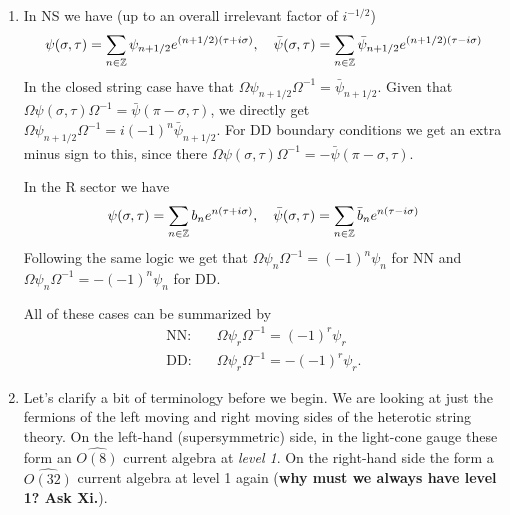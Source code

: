 \documentclass[11pt, class=article, crop=false]{standalone}
\begin{document}
\begin{enumerate}
	\item In NS we have (up to an overall irrelevant factor of $i^{-1/2}$)
	\[
		\psi(\sigma, \tau) = \sum_{n\in \mathbb{Z}} \psi_{n+1/2} e^{(n+1/2) (\tau + i \sigma)}, \quad \bar \psi(\sigma, \tau) = \sum_{n\in \mathbb{Z}} \bar \psi_{n+1/2} e^{(n+1/2) (\tau - i \sigma)}
	\]
	In the closed string case have that $\Omega \psi_{n+1/2} \Omega^{-1} = \bar \psi_{n+1/2}$. 
	Given that $\Omega \psi(\sigma, \tau) \Omega^{-1} = \bar \psi(\pi - \sigma, \tau)$, we directly get $\Omega \psi_{n+1/2} \Omega^{-1} = i (-1)^n \bar \psi_{n+1/2}$. For DD boundary conditions we get an extra minus sign to this, since there $\Omega \psi(\sigma, \tau) \Omega^{-1} = - \bar \psi(\pi - \sigma, \tau)$. 
	
	In the R sector we have
	\[
		\psi(\sigma, \tau) = \sum_{n\in \mathbb{Z}} b_n e^{n (\tau + i \sigma)}, \quad \bar \psi(\sigma, \tau) = \sum_{n\in \mathbb{Z}} \bar b_n e^{n (\tau - i \sigma)}
	\]
	Following the same logic we get that $\Omega \psi_{n} \Omega^{-1} = (-1)^n \psi_n$ for NN and $\Omega \psi_{n} \Omega^{-1} = -(-1)^n \psi_n$ for DD.
	
	All of these cases can be summarized by
	\[
		\begin{aligned}
			\text{NN:}\quad & \Omega \psi_r \Omega^{-1} = (-1)^r \psi_r \\ 
			\text{DD:}\quad & \Omega \psi_r \Omega^{-1} = - (-1)^r \psi_r.
		\end{aligned}
	\]
	\item Let's clarify a bit of terminology before we begin. We are looking at just the fermions of the left moving and right moving sides of the heterotic string theory. On the left-hand (supersymmetric) side, in the light-cone gauge these form an $\widehat{O(8)}$ current algebra at \emph{level 1}. On the right-hand side the form a $\widehat{O(32)}$ current algebra at level 1 again (\textbf{why must we always have level 1? Ask Xi.}). 
	

\end{enumerate}
\end{document}
